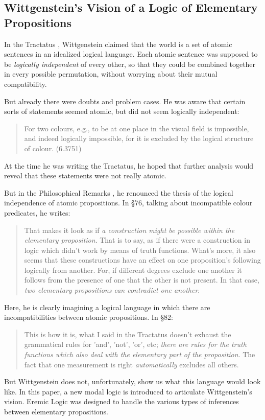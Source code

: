 \subsection{Wittgenstein's Vision of a Logic of Elementary Propositions}

In the Tractatus \cite{wittgenstein-tractatus}, Wittgenstein claimed
that the world is a set of atomic sentences in an idealized logical
language.  Each atomic sentence was supposed to be \emph{logically
  independent} of every other, so that they could be combined together
in every possible permutation, without worrying about their mutual
compatibility.

But already there were doubts and problem cases. 
He was aware that certain sorts of statements seemed atomic, but did not seem logically independent:
\begin{quote}
For two colours, e.g., to be at one place in the visual field is impossible, and indeed logically impossible, for it is excluded by the logical structure of colour. (6.3751)
\end{quote}
At the time he was writing the Tractatus, he hoped that further analysis would reveal that these statements were not really atomic. 

But in the Philosophical Remarks \cite{wittgenstein-remarks}, he renounced the thesis of the logical independence of atomic propositions. 
In \S 76, talking about incompatible colour predicates, he writes:
\begin{quote}
That makes it look as if \emph{a construction might be possible within the elementary proposition}. That is to say, as if there were a construction in logic which didn't work by means of truth functions. 
What's more, it also seems that these constructions have an effect on one proposition's following logically from another. 
For, if different degrees exclude one another it follows from the presence of one that the other is not present. 
In that case, \emph{two elementary propositions can contradict one another}.
\end{quote}
Here, he is clearly imagining a logical language in which there are incompatibilities between atomic propositions. In \S 82:
\begin{quote}
This is how it is, what I said in the Tractatus doesn't exhaust the grammatical rules for 'and', 'not', 'or', etc; \emph{there are rules for the truth functions which also deal with the elementary part of the proposition}.
The fact that one measurement is right \emph{automatically} excludes all others. 
\end{quote}
But Wittgenstein does not, unfortunately, show us what this language would look like.
In this paper, a new modal logic is introduced to articulate Wittgenstein's vision. 
Eremic Logic was designed to handle the various types of inferences between elementary propositions.

